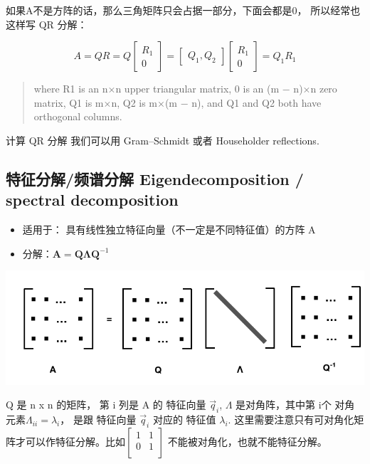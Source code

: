 \documentclass[
]{book}
\providecommand{\tightlist}{%
  \setlength{\itemsep}{0pt}\setlength{\parskip}{0pt}}
\begin{document}
如果A不是方阵的话，那么三角矩阵只会占据一部分，下面会都是0， 所以经常也这样写 QR 分解：

\[{\displaystyle A=QR=Q{\begin{bmatrix}R_{1}\\0\end{bmatrix}}={\begin{bmatrix}Q_{1},Q_{2}\end{bmatrix}}{\begin{bmatrix}R_{1}\\0\end{bmatrix}}=Q_{1}R_{1}}\]

\begin{quote}
where R1 is an n×n upper triangular matrix, 0 is an (m − n)×n zero matrix, Q1 is m×n, Q2 is m×(m − n), and Q1 and Q2 both have orthogonal columns.
\end{quote}

计算 QR 分解 我们可以用 Gram--Schmidt 或者 Householder reflections.

\hypertarget{ux7279ux5f81ux5206ux89e3ux9891ux8c31ux5206ux89e3-eigendecomposition-spectral-decomposition}{%
\subsection{特征分解/频谱分解 Eigendecomposition / spectral decomposition}\label{ux7279ux5f81ux5206ux89e3ux9891ux8c31ux5206ux89e3-eigendecomposition-spectral-decomposition}}

\begin{itemize}
\tightlist
\item
  适用于： 具有线性独立特征向量（不一定是不同特征值）的方阵 A
\item
  分解：\(\mathbf{A}=\mathbf{Q}\mathbf{\Lambda}\mathbf{Q}^{-1}\)
\end{itemize}

\includegraphics{images/eigen_00.png}

Q 是 n x n 的矩阵， 第 i 列是 A 的 特征向量 \(\vec{q}_i\), \(\Lambda\) 是对角阵，其中第 i个 对角元素\(\Lambda_{ii} = \lambda_i\)， 是跟 特征向量 \(\vec{q}_i\) 对应的 特征值 \(\lambda_i\). 这里需要注意只有可对角化矩阵才可以作特征分解。比如\({\displaystyle {\begin{bmatrix}1&1\\0&1\\\end{bmatrix}}}\) 不能被对角化，也就不能特征分解。
\end{document}
